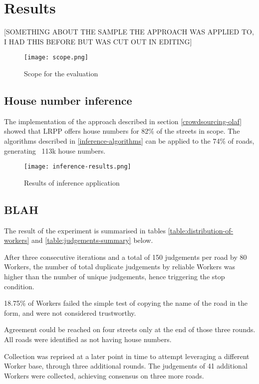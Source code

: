 \section{Results}

[SOMETHING ABOUT THE SAMPLE THE APPROACH WAS APPLIED TO, I HAD THIS BEFORE BUT WAS CUT OUT IN EDITING]

\begin{figure}
	\texttt{[image: scope.png]}
	\caption{Scope for the evaluation}
	\label{fig:scope}
\end{figure}

\subsection{House number inference}

The implementation of the approach described in section \ref{crowdsourcing-olaf} showed that LRPP offers house numbers for 82\% of the streets in scope. The algorithms described in \ref{inference-algorithms} can be applied to the 74\% of roads, generating ~113k house numbers. 

\begin{figure}
	\texttt{[image: inference-results.png]}
	\caption{Results of inference application}
	\label{fig:results-inference}
\end{figure}

\subsection{BLAH}

The result of the experiment is summarised in tables \ref{table:distribution-of-workers} and \ref{table:judgements-summary} below. 

After three consecutive iterations and a total of 150 judgements per road by 80 Workers, the number of total duplicate judgements by reliable Workers was higher than the number of unique judgements, hence triggering the stop condition. 

18.75\% of Workers failed the simple test of copying the name of the road in the form, and were not considered trustworthy. 

Agreement could be reached on four streets only at the end of those three rounds. All roads were identified as not having house numbers.

Collection was reprised at a later point in time to attempt leveraging a different Worker base, through three additional rounds. The judgements of 41 additional Workers were collected, achieving consensus on three more roads. 

